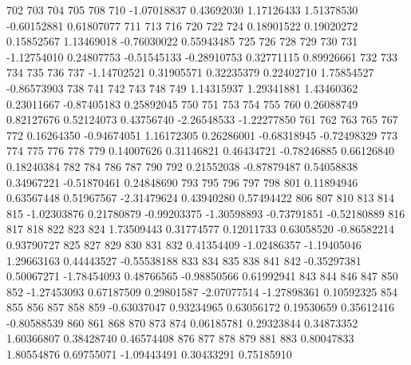 \documentclass{article}
\begin{document}
\begin{Schunk}
\begin{Soutput}
        702         703         704         705         708         710 
-1.07018837  0.43692030  1.17126433  1.51378530 -0.60152881  0.61807077 
        711         713         716         720         722         724 
 0.18901522  0.19020272  0.15852567  1.13469018 -0.76030022  0.55943485 
        725         726         728         729         730         731 
-1.12754010  0.24807753 -0.51545133 -0.28910753  0.32771115  0.89926661 
        732         733         734         735         736         737 
-1.14702521  0.31905571  0.32235379  0.22402710  1.75854527 -0.86573903 
        738         741         742         743         748         749 
 1.14315937  1.29341881  1.43460362  0.23011667 -0.87405183  0.25892045 
        750         751         753         754         755         760 
 0.26088749  0.82127676  0.52124073  0.43756740 -2.26548533 -1.22277850 
        761         762         763         765         767         772 
 0.16264350 -0.94674051  1.16172305  0.26286001 -0.68318945 -0.72498329 
        773         774         775         776         778         779 
 0.14007626  0.31146821  0.46434721 -0.78246885  0.66126840  0.18240384 
        782         784         786         787         790         792 
 0.21552038 -0.87879487  0.54058838  0.34967221 -0.51870461  0.24848690 
        793         795         796         797         798         801 
 0.11894946  0.63567448  0.51967567 -2.31479624  0.43940280  0.57494422 
        806         807         810         813         814         815 
-1.02303876  0.21780879 -0.99203375 -1.30598893 -0.73791851 -0.52180889 
        816         817         818         822         823         824 
 1.73509443  0.31774577  0.12011733  0.63058520 -0.86582214  0.93790727 
        825         827         829         830         831         832 
 0.41354409 -1.02486357 -1.19405046  1.29663163  0.44443527 -0.55538188 
        833         834         835         838         841         842 
-0.35297381  0.50067271 -1.78454093  0.48766565 -0.98850566  0.61992941 
        843         844         846         847         850         852 
-1.27453093  0.67187509  0.29801587 -2.07077514 -1.27898361  0.10592325 
        854         855         856         857         858         859 
-0.63037047  0.93234965  0.63056172  0.19530659  0.35612416 -0.80588539 
        860         861         868         870         873         874 
 0.06185781  0.29323844  0.34873352  1.60366807  0.38428740  0.46574408 
        876         877         878         879         881         883 
 0.80047833  1.80554876  0.69755071 -1.09443491  0.30433291  0.75185910 

\end{Soutput}
\end{Schunk}
\end{document}
